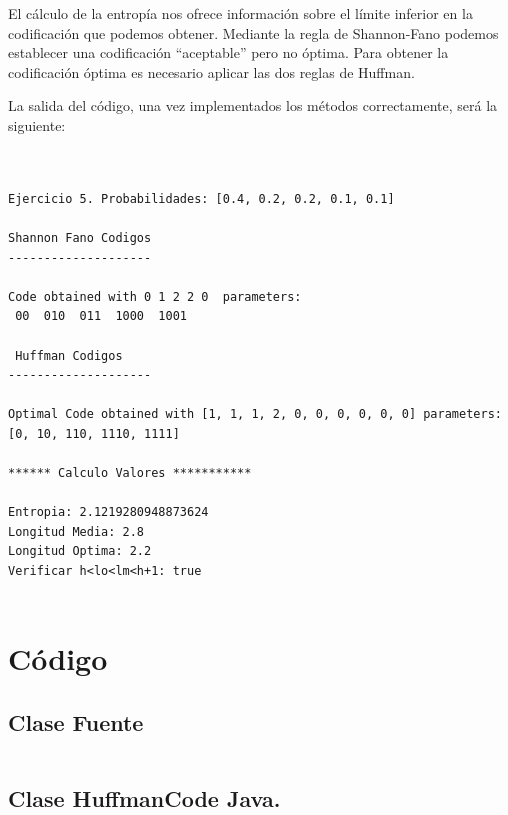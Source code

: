 \documentclass{article}
\begin{document}
El cálculo de la entropía nos ofrece información sobre el límite inferior en la codificación que podemos obtener. Mediante la regla de Shannon-Fano podemos establecer una codificación ``aceptable'' pero no óptima. Para obtener la codificación óptima es necesario aplicar las dos reglas de Huffman.

La salida del código, una vez implementados los métodos correctamente, será la siguiente:

\begin{verbatim}
 
 
Ejercicio 5. Probabilidades: [0.4, 0.2, 0.2, 0.1, 0.1]

Shannon Fano Codigos
--------------------

Code obtained with 0 1 2 2 0  parameters: 
 00  010  011  1000  1001 

 Huffman Codigos
--------------------

Optimal Code obtained with [1, 1, 1, 2, 0, 0, 0, 0, 0, 0] parameters:
[0, 10, 110, 1110, 1111]

****** Calculo Valores ***********

Entropia: 2.1219280948873624
Longitud Media: 2.8
Longitud Optima: 2.2
Verificar h<lo<lm<h+1: true 
 
\end{verbatim}



\section{Código}


\subsection*{Clase Fuente } 

\inputminted[mathescape,
               numbersep=5pt,
               frame=lines,
               framesep=2mm]{java}{practica2/Fuente.java}

 
\subsection*{Clase HuffmanCode Java.} 
\inputminted[mathescape,
               numbersep=5pt,
               frame=lines,
               framesep=2mm]{java}{practica2/HuffmanCode.java}
               
\end{document}
